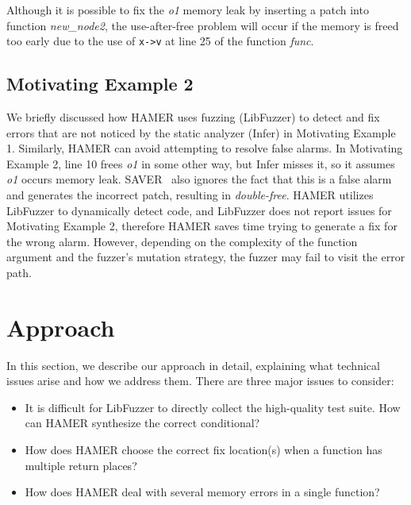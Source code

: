 \documentclass[a4paper,11pt,oneside,openany]{book}
\begin{document}
Although it is possible to fix the  {\it o1} memory leak by inserting a patch into function  {\it new\_node2}, the use-after-free problem will occur if the memory is freed too early due to the use of  \verb|x->v| at line 25 of the function  {\it func}.




\section{Motivating Example 2}
We briefly discussed how HAMER uses fuzzing (LibFuzzer) to detect and fix errors that are not noticed by the static analyzer (Infer) in Motivating Example 1. Similarly, HAMER can avoid attempting to resolve false alarms. In Motivating Example 2, line 10 frees {\it o1} in some other way, but Infer misses it, so it assumes {\it o1} occurs memory leak. SAVER~\cite{SAVER} also ignores the fact that this is a false alarm and generates the incorrect patch, resulting in {\it double-free}. HAMER utilizes LibFuzzer to dynamically detect code, and LibFuzzer does not report issues for Motivating Example 2, therefore HAMER saves time trying to generate a fix for the wrong alarm. However, depending on the complexity of the function argument and the fuzzer's mutation strategy, the fuzzer may fail to visit the error path.


\chapter{Approach}
\label{approach}
In this section, we describe our approach in detail, explaining what technical issues arise and how we address them. There are three major issues to consider:
\begin{itemize}
\item It is difficult for LibFuzzer to directly collect the high-quality test suite. How can HAMER synthesize the correct conditional?
\item How does HAMER choose the correct fix location(s) when a function has multiple return places?
\item How does HAMER deal with several memory errors in a single function?
\end{itemize}
\end{document}
